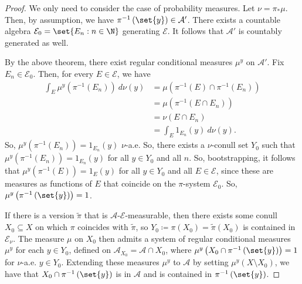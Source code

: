 \documentclass[10pt]{mypackage}
\renewcommand{\coloneq}{\coloneqq}
\begin{document}
\begin{proof}
  We only need to consider the case of probability measures. Let $\nu = \pi_{\ast}\mu$. Then, by assumption, we have $\pi^{-1}\left( \set{y} \right)\in \mathcal{A}'$. There exists a countable algebra $\mathcal{E}_0 = \set{E_n : n\in \N}$ generating $\mathcal{E}$. It follows that $\mathcal{A}'$ is countably generated as well.

  By the above theorem, there exist regular conditional measures $\mu^y$ on $\mathcal{A}'$. Fix $E_n\in \mathcal{E}_0$. Then, for every $E\in \mathcal{E}$, we have
  \begin{align*}
    \int_{E}^{} \mu^y\left( \pi^{-1}\left( E_n \right) \right)\:d\nu(y) &= \mu\left( \pi^{-1}\left( E \right)\cap \pi^{-1}\left( E_n \right) \right)\\
                                                                        &= \mu\left( \pi^{-1}\left( E\cap E_n \right) \right)\\
                                                                        &= \nu\left( E\cap E_n \right)\\
                                                                        &= \int_{E}^{} 1_{E_n}(y)\:d\nu(y).
  \end{align*}
  So, $\mu^y\left( \pi^{-1}\left( E_n \right) \right) = 1_{E_n}(y)$ $\nu$-a.e. So, there exists a $\nu$-conull set $Y_0$ such that $\mu^y\left( \pi^{-1}\left( E_n \right) \right) = 1_{E_n}(y)$ for all $y\in Y_0$ and all $n$. So, bootstrapping, it follows that $\mu^y\left( \pi^{-1}\left( E \right) \right) = 1_E(y)$ for all $y\in Y_0$ and all $E\in \mathcal{E}$, since these are measures as functions of $E$ that coincide on the $\pi$-system $\mathcal{E}_0$. So, $\mu^y\left( \pi^{-1}\left( \set{y} \right) \right) = 1$.

  If there is a version $ \widetilde{\pi} $ that is $\mathcal{A}$-$\mathcal{E}$-measurable, then there exists some conull $X_0\subseteq X$ on which $ \pi $ coincides with $ \widetilde{\pi} $, so $Y_0 \coloneq \pi\left( X_0 \right) = \widetilde{\pi}\left( X_0 \right)$ is contained in $\mathcal{E}_{\nu}$. The measure $\mu$ on $X_0$ then admits a system of regular conditional measures $\mu^y$ for each $y\in Y_0$, defined on $\mathcal{A}_{X_0} = \mathcal{A}\cap X_0$, where $\mu^y\left( X_0\cap \pi^{-1}\left( \set{y} \right) \right) = 1$ for $\nu$-a.e. $y\in Y_0$. Extending these measures $\mu^y$ to $ \mathcal{A} $ by setting $\mu^y\left( X\setminus X_0 \right)$, we have that $X_0\cap \pi^{-1}\left( \set{y} \right)$ is in $\mathcal{A}$ and is contained in $\pi^{-1}\left( \set{y} \right)$.
\end{proof}
\end{document}
